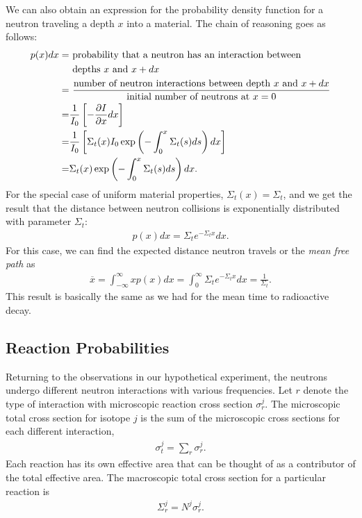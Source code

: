 We can also obtain an expression for the probability density function for a neutron traveling a depth $x$ into a material. The chain of reasoning goes as follows:
\begin{align}
  p(x) dx = &\text{ probability that a neutron has an interaction between} \nonumber \\ 
            &\text{ depths $x$ and $x + dx$} \nonumber \\
          = &\ \frac{\text{number of neutron interactions between depth $x$ and $x + dx$}}{\text{initial number of neutrons at $x = 0$}} \nonumber \\
          = &\frac{1}{I_0} \left[ -\frac{ \partial {I} }{ \partial {x} } dx \right] \nonumber \\
          = &\frac{1}{I_0} \left[ \Sigma_t(x) I_0 \exp\left( -\int_0^x \Sigma_t(s) ds \right) dx \right] \nonumber \\
          = &\Sigma_t(x) \exp\left( -\int_0^x \Sigma_t(s) ds \right) dx.
\end{align}
For the special case of uniform material properties, $\Sigma_t(x) = \Sigma_t$, and we get the result that the distance between neutron collisions is exponentially distributed with parameter $\Sigma_t$:
\begin{align}
  p(x) dx = \Sigma_t e^{-\Sigma_t x} dx .
\end{align}
For this case, we can find the expected distance neutron travels or the \emph{mean free path} as
\begin{align}
  \overline{x} = \int_{-\infty}^\infty x p(x) dx = \int_0^\infty \Sigma_t e^{-\Sigma_t x} dx = \frac{1}{\Sigma_t} .
\end{align}
This result is basically the same as we had for the mean time to radioactive decay.

\subsection{Reaction Probabilities}

Returning to the observations in our hypothetical experiment, the neutrons undergo different neutron interactions with various frequencies. Let $r$ denote the type of interaction with microscopic reaction cross section $\sigma_r^j$. The microscopic total cross section for isotope $j$ is the sum of the microscopic cross sections for each different interaction,
\begin{align}
  \sigma_t^j = \sum_r \sigma_r^j .
\end{align}
Each reaction has its own effective area that can be thought of as a contributor of the total effective area. The macroscopic total cross section for a particular reaction is
\begin{align}
  \Sigma_r^j = N^j \sigma_r^j .
\end{align}

